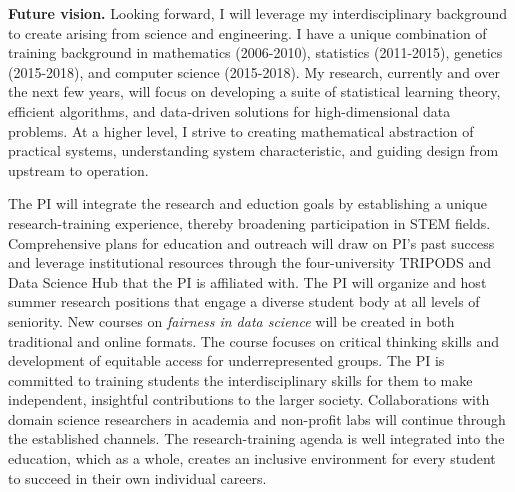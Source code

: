 \documentclass[11pt]{article}
\theoremstyle{exampstyle}
\theoremstyle{definition}
\begin{document}
{\bf Future vision.} Looking forward, I will leverage my interdisciplinary background to create arising from science and engineering. I have a unique combination of training background in mathematics (2006-2010), statistics (2011-2015), genetics (2015-2018), and computer science (2015-2018). My research, currently and over the next few years, will focus on developing a suite of statistical learning theory, efficient algorithms, and data-driven solutions for high-dimensional data problems. At a higher level, I  strive to creating mathematical abstraction of practical systems, understanding system characteristic, and guiding design from upstream to operation. 



\newpage
The PI will integrate the research and eduction goals by establishing a unique research-training experience, thereby broadening participation in STEM fields. Comprehensive plans for education and outreach will draw on PI's past success and leverage institutional resources through the four-university TRIPODS and Data Science Hub that the PI is affiliated with. The PI will organize and host summer research positions that engage a diverse student body at all levels of seniority. New courses on {\it fairness in data science} will be created in both traditional and online formats. The course focuses on critical thinking skills and development of equitable access for underrepresented groups. The PI is committed to training students the interdisciplinary skills for them to make independent, insightful contributions to the larger society. Collaborations with domain science researchers in academia and non-profit labs will continue through the established channels. The research-training agenda is well integrated into the education, which as a whole, creates an inclusive environment for every student to succeed in their own individual careers.  
 
\end{document}
